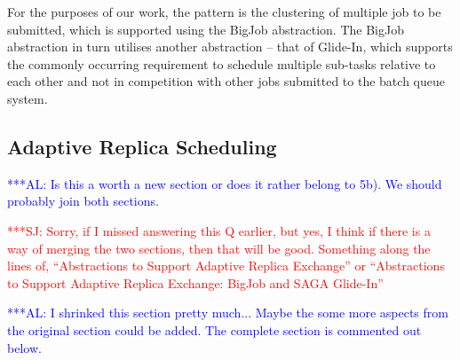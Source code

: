 \documentclass{rspublic}
\newcommand{\alnote}[1]{ {\textcolor{blue} { ***AL: #1 }}}
\newcommand{\jhanote}[1]{ {\textcolor{red} { ***SJ: #1 }}}
\newcommand{\alnote}[1]{}
\newcommand{\jhanote}[1]{}
\begin{document}
For the purposes of our work, the pattern is the clustering of
multiple job to be submitted, which is supported using the BigJob
abstraction. The BigJob abstraction in turn utilises another
abstraction -- that of Glide-In, which supports the commonly occurring
requirement to schedule multiple sub-tasks relative to each other and
not in competition with other jobs submitted to the batch queue
system.
                         
%
%
   
\subsection{Adaptive Replica Scheduling}
\label{sec:adaptivitiy}    
\alnote{Is this a worth a new section or does it rather belong to
  5b). We should probably join both sections.}  

\jhanote{Sorry, if I missed answering this Q earlier, but yes, I think
  if there is a way of merging the two sections, then that will be
  good. Something along the lines of, ``Abstractions to Support
  Adaptive Replica Exchange'' or ``Abstractions to Support Adaptive
  Replica Exchange: BigJob and SAGA Glide-In''}

\alnote{I shrinked this section pretty much... Maybe the some more
    aspects from the original section could be added. The complete
    section is commented out below.}
\end{document}
